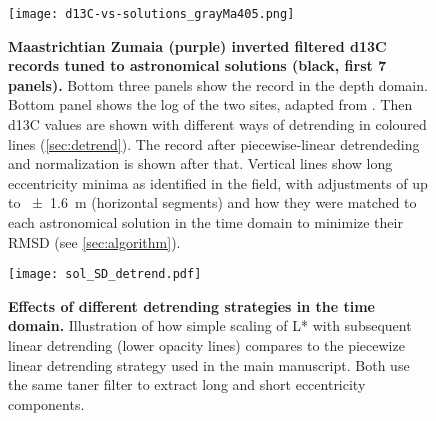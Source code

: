 \documentclass[]{agujournal2019}
\newcommand{\ijk}{\textcolor{blue}}
\begin{document}
\begin{figure}
  \centering
  \texttt{[image: d13C-vs-solutions\_grayMa405.png]}
  \caption{\label{fig:rolling-age-d13C}
    \textbf{Maastrichtian Zumaia (purple) inverted filtered \gls{d13C} records tuned to astronomical solutions (black, first 7 panels).}
    Bottom three panels show the record in the depth domain.
    Bottom panel shows the log of the two sites, adapted from .
    Then \gls{d13C} values are shown with different ways of detrending in coloured lines (\cref{sec:detrend}).
    The record after piecewise-linear detrendeding and normalization is shown after that.
    Vertical lines show long eccentricity minima as identified in the field,
    with adjustments of up to \qty{\pm1.6}{\metre} (horizontal segments)
    and how they were matched to each astronomical solution in the time domain to minimize their \gls{RMSD} (see \cref{sec:algorithm}).
    }
\end{figure}


\begin{figure}
  \centering \texttt{[image: sol\_SD\_detrend.pdf]}
  \caption{\label{fig:Lstar-detrend}
  \textbf{Effects of different detrending strategies in the time domain.}
    Illustration of how simple scaling of \gls{L*} with subsequent linear detrending (lower opacity lines)
    compares to the piecewize linear detrending strategy used in the main manuscript.
    Both use the same taner filter to extract long and short eccentricity components.
    }
\end{figure}
\end{document}
